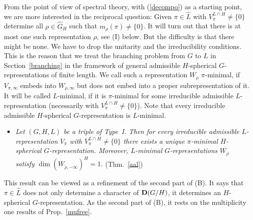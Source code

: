 \documentclass[10]{amsart}
\theoremstyle{remark}
\theoremstyle{definition}
\numberwithin{equation}{section}
\begin{document}
From the point of view of spectral theory, with (\ref{decompo}) as a starting point, we are more interested in the reciprocal question: Given $\pi\in\widehat L$ with $V_\pi^{L\cap H}\ne\{0\}$ determine
all $\rho\in \widehat G_H$ such that $m_\rho(\pi)\ne \{0\}$. It will turn out that there is at most one such representation $\rho$, see (I) below. But the difficulty is that there might be none. We have to drop the unitarity and the irreducibility conditions. This is the reason that we treat the branching problem from $G$ to $L$ in Section~\ref{branching} in the framework of general admissible $H$-spherical $G$-representations of finite length. We call such a representation $W_\rho$ $\pi$-minimal, if $V_{\pi,\infty}$ embeds into $W_{\rho,\infty}$ but does not embed into a proper subrepresentation of it. It will be called $L$-minimal, if it is $\pi$-minimal for some irreducible admissible $L$-representation (necessarily with $V_\pi^{L\cap H}\ne\{0\}$). Note that every irreducible admissible $H$-spherical $G$-representation is $L$-minimal.
\begin{itemize}
\item[({\bf I})] {\em Let $(G,H,L)$ be a triple of Type~I. Then for every irreducible admissible $L$-representation $V_\pi$ with $V_\pi^{L\cap H}\ne\{0\}$ there exists a unique
$\pi$-minimal $H$-spherical $G$-representation. Moreover, $L$-minimal $G$-representations $W_\rho$  satisfy $\dim (W_{\tilde\rho,-\infty})^H=1$.} (Thm.~\ref{aal})
\end{itemize}
This result can be viewed as a refinement of the second part of (B). It says that $\pi\in \widehat L$ does not only determine a character of ${\bf D}(G/H)$, it determines
an $H$-spherical $G$-representation. As the second part of (B), it rests on the multiplicity one results of Prop.~\ref{mufree}.
\end{document}
